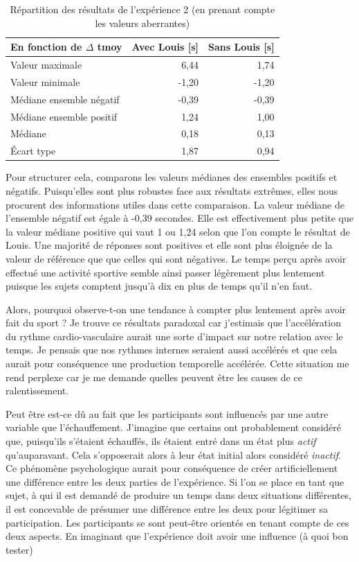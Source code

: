 \documentclass[12pt,fleqn,oneside,french,openany]{book} %
\begin{document}
\begin{table}[h!]
	\centering
	\caption{Répartition des résultats de l'expérience 2 (en prenant compte les valeurs aberrantes)} \label{tbl:analyse2.2}
	\begin{tabular}{lrr}
		\toprule 
		\textbf{En fonction de $\Delta$ tmoy} & \textbf{Avec Louis [s]} & \textbf{Sans Louis [s]} \\ \midrule
		Valeur maximale & 6,44 & 1,74 \\
		Valeur minimale & -1,20 & -1,20 \\
		Médiane ensemble négatif & -0,39 & -0,39 \\
		Médiane ensemble positif & 1,24 & 1,00 \\
		Médiane & 0,18 & 0,13 \\
		\'Ecart type & 1,87 & 0,94 \\ \bottomrule
	\end{tabular}
\end{table}

Pour structurer cela, comparons les valeurs médianes des ensembles positifs et négatifs. Puisqu'elles sont plus robustes face aux résultats extrêmes, elles nous procurent des informations utiles dans cette comparaison. La valeur médiane de l'ensemble négatif est égale à -0,39 secondes. Elle est effectivement plus petite que la valeur médiane positive qui vaut 1 ou 1,24 selon que l'on compte le résultat de Louis. Une majorité de réponses sont positives et elle sont plus éloignée de la valeur de référence que que celles qui sont négatives. Le temps perçu après avoir effectué une activité sportive semble ainsi passer légèrement plus lentement puisque les sujets comptent jusqu'à dix en plus de temps qu'il n'en faut. 

Alors, pourquoi observe-t-on une tendance à compter plus lentement après avoir fait du sport ? Je trouve ce résultats paradoxal car j'estimais que l'accélération du rythme cardio-vasculaire aurait une sorte d'impact sur notre relation avec le temps. Je pensais que nos rythmes internes seraient aussi accélérés et que cela aurait pour conséquence une production temporelle accélérée. Cette situation me rend perplexe car je me demande quelles peuvent être les causes de ce ralentissement.

Peut être est-ce dû au fait que les participants sont influencés par une autre variable que l'échauffement. J'imagine que certains ont probablement considéré que, puisqu'ils s'étaient échauffés, ils étaient entré dans un état plus \emph{actif} qu'auparavant. Cela s'opposerait alors à leur état initial alors considéré \emph{inactif}. Ce phénomène psychologique aurait pour conséquence de créer artificiellement une différence entre les deux parties de l'expérience. Si l'on se place en tant que sujet, à qui il est demandé de produire un temps dans deux situations différentes, il est concevable de présumer une différence entre les deux pour légitimer sa participation. Les participants se sont peut-être orientés en tenant compte de ces deux aspects. En imaginant que l'expérience doit avoir une influence (à quoi bon tester)
\end{document}

